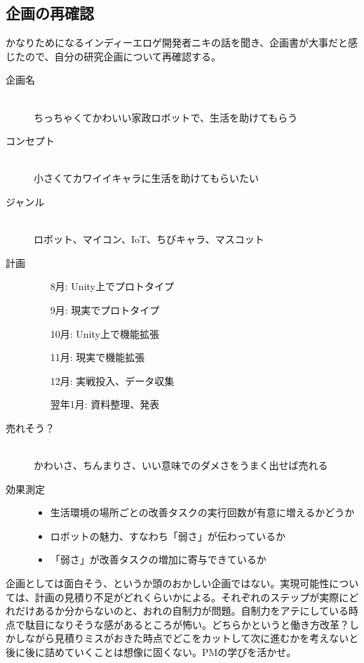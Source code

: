 \documentclass[fleqn,twocolumn]{mynote}
\begin{document}
\subsection*{企画の再確認}
かなりためになるインディーエロゲ開発者ニキの話を聞き、企画書が大事だと感じたので、自分の研究企画について再確認する。
\begin{description}
  \item[企画名]\mbox{}\\
    ちっちゃくてかわいい家政ロボットで、生活を助けてもらう
  \item[コンセプト]\mbox{}\\
    小さくてカワイイキャラに生活を助けてもらいたい
  \item[ジャンル]\mbox{}\\
    ロボット、マイコン、IoT、ちびキャラ、マスコット
  \item[計画]\mbox{}
    \begin{itemize}
      \item[8月: ]Unity上でプロトタイプ
      \item[9月: ]現実でプロトタイプ
      \item[10月: ]Unity上で機能拡張
      \item[11月: ]現実で機能拡張
      \item[12月: ]実戦投入、データ収集
      \item[翌年1月: ]資料整理、発表
    \end{itemize}
  \item[売れそう？]\mbox{}\\
    かわいさ、ちんまりさ、いい意味でのダメさをうまく出せば売れる
  \item[効果測定]\mbox{}
    \begin{itemize}
      \item 生活環境の場所ごとの改善タスクの実行回数が有意に増えるかどうか
      \item ロボットの魅力、すなわち「弱さ」が伝わっているか
      \item 「弱さ」が改善タスクの増加に寄与できているか
    \end{itemize}
\end{description}

企画としては面白そう、というか頭のおかしい企画ではない。実現可能性については、計画の見積り不足がどれくらいかによる。それぞれのステップが実際にどれだけあるか分からないのと、おれの自制力が問題。自制力をアテにしている時点で駄目になりそうな感があるところが怖い。どちらかというと働き方改革？しかしながら見積りミスがおきた時点でどこをカットして次に進むかを考えないと後に後に詰めていくことは想像に固くない。PMの学びを活かせ。
\end{document}
